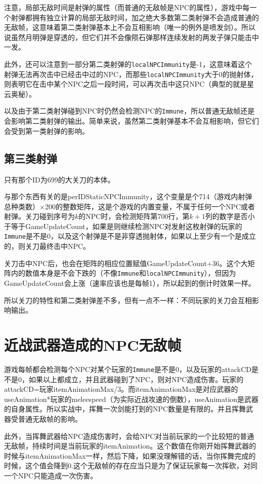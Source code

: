 注意，局部无敌时间是射弹的属性（而普通的无敌帧是NPC的属性），游戏中每一个射弹都拥有独立计算的局部无敌时间，加之绝大多数第二类射弹不会造成普通的无敌帧，这意味着第二类射弹基本上不会互相影响（唯一的例外是喷发剑）。所以说虽然月明弹是穿透的，但它们并不会像陨石弹那样连续发射的两发子弹只能击中一发。

此外，还可以注意到一部分第二类射弹的\lstinline{localNPCImmunity}是-1，这意味着这个射弹无法再次击中已经击中过的NPC，而那些\lstinline{localNPCImmunity}大于0的抛射体，则表明它在击中某个NPC之后一段时间，可以再次击中这只NPC（典型的就是星云奥秘）。

以及由于第二类射弹碰到NPC时仍然会检测NPC的\lstinline{Immune}，所以普通无敌帧还是会影响第二类射弹的输出。简单来说，虽然第二类射弹基本不会互相影响，但它们会受到第一类射弹的影响。

\subsection{第三类射弹}\label{sec27}
只有那个ID为699的大关刀的本体。

与那个东西有关的是perIDStaticNPCImmunity，这个变量是个714（游戏内射弹总种类数）$\times$200的整数矩阵，这是个游戏的内置变量，不属于任何一个NPC或者射弹。关刀碰到序号为$k$的NPC时，会检测矩阵第700行，第$k+1$列的数字是否小于等于GameUpdateCount，如果是则继续检测NPC对发射这枚射弹的玩家的\lstinline{Immune}是不是0，以及这个射弹是不是非穿透抛射体，如果以上至少有一个是成立的，则关刀最终击中NPC。

关刀击中NPC后，也会在矩阵的相应位置赋值GameUpdateCount+36。这个大矩阵内的数值本身是不会下跌的（不像\lstinline{Immune}和\lstinline{localNPCImmunity}），但因为GameUpdateCount会上涨（速率应该也是每帧1），所以起到的倒计时效果一样。

所以关刀的特性和第二类射弹差不多，但有一点不一样：不同玩家的关刀会互相影响输出。

\section{近战武器造成的NPC无敌帧}\label{sec28}
游戏每帧都会检测每个NPC对某个玩家的\lstinline{Immune}是不是0，以及玩家的attackCD是不是0，如果以上都成立，并且武器碰到了NPC，则对NPC造成伤害。玩家的attackCD=玩家itemAnimationMax/3。而itemAnimationMax是对应武器的useAnimation*玩家的meleespeed（为实际近战攻速的倒数），useAnimation是武器的自身属性。所以实战中，挥舞一次剑能打到的NPC数量是有限的。并且挥舞武器受普通无敌帧的影响。

此外，当挥舞武器给NPC造成伤害时，会给NPC对当前玩家的一个比较短的普通无敌帧，持续时间是当前玩家的itemAnimation。这个数值在你刚开始挥舞武器的时候与itemAnimationMax一样，然后下降，如果没理解错的话，当你挥舞完成的时候，这个值会降到0.这个无敌帧的存在应当只是为了保证玩家每一次挥砍，对同一个NPC只能造成一次伤害。

